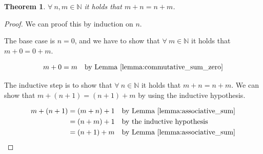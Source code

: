 \documentclass[a4paper]{article}
\newtheorem{theorem}{Theorem}
\begin{document}
\begin{theorem}\label{theorem:commutative_sum}
\(\forall \ n, m \in \mathbb{N}\) it holds that \(m + n = n + m\).
\end{theorem}

\begin{proof}
  We can proof this by induction on \(n\).

  The base case is \(n = 0\), and we have to show that \(\forall \ m \in \mathbb{N}\) it holds that \(m + 0 = 0 + m\).

  \begin{align*}
    m + 0 &= m \quad \text{by Lemma \ref{lemma:commutative_sum_zero}} \\
  \end{align*}

  The inductive step is to show that \(\forall \ n \in \mathbb{N}\) it holds that \(m + n = n + m\). We can show that \(m + (n + 1) = (n + 1) + m\) by using the inductive hypothesis.

  \begin{align*}
    m + (n + 1) &= (m + n) + 1 \quad \text{by Lemma \ref{lemma:associative_sum}} \\
                &= (n + m) + 1 \quad \text{by the inductive hypothesis} \\
                &= (n + 1) + m \quad \text{by Lemma \ref{lemma:associative_sum}}
  \end{align*}

\end{proof}

% 
% 
% 
% 
% 
% 
% 
% 
% 
% 
% 
% 
% 
% 
% 
% 

\end{document}
